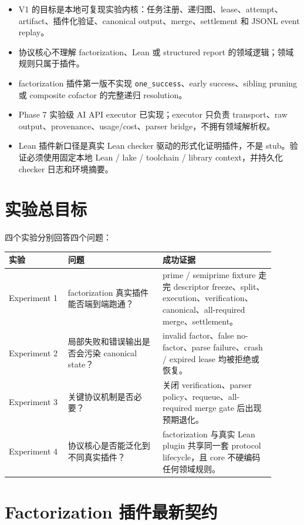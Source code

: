 \documentclass[11pt]{ctexart}
\begin{document}
\begin{itemize}[leftmargin=2em]
  \item V1 的目标是本地可复现实验内核：任务注册、递归图、lease、attempt、artifact、插件化验证、canonical output、merge、settlement 和 JSONL event replay。
  \item 协议核心不理解 factorization、Lean 或 structured report 的领域逻辑；领域规则只属于插件。
  \item factorization 插件第一版不实现 \texttt{one\_success}、early success、sibling pruning 或 composite cofactor 的完整递归 resolution。
  \item Phase 7 实验级 AI API executor 已实现；executor 只负责 transport、raw output、provenance、usage/cost、parser bridge，不拥有领域解析权。
  \item Lean 插件新口径是真实 Lean checker 驱动的形式化证明插件，不是 stub。验证必须使用固定本地 Lean / lake / toolchain / library context，并持久化 checker 日志和环境摘要。
\end{itemize}

\section{实验总目标}

四个实验分别回答四个问题：

\begin{longtable}{p{0.2\linewidth}p{0.32\linewidth}p{0.38\linewidth}}
\toprule
实验 & 问题 & 成功证据 \\
\midrule
Experiment 1 & factorization 真实插件能否端到端跑通？ & prime / semiprime fixture 走完 descriptor freeze、split、execution、verification、canonical、all-required merge、settlement。 \\
Experiment 2 & 局部失败和错误输出是否会污染 canonical state？ & invalid factor、false no-factor、parse failure、crash / expired lease 均被拒绝或恢复。 \\
Experiment 3 & 关键协议机制是否必要？ & 关闭 verification、parser policy、requeue、all-required merge gate 后出现预期退化。 \\
Experiment 4 & 协议核心是否能泛化到不同真实插件？ & factorization 与真实 Lean plugin 共享同一套 protocol lifecycle，且 core 不硬编码任何领域规则。 \\
\bottomrule
\end{longtable}

\section{Factorization 插件最新契约}
\end{document}
